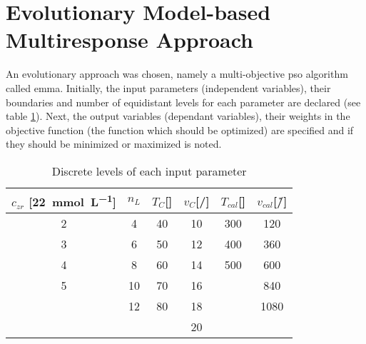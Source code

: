 \section{Evolutionary Model-based Multiresponse Approach}
\label{sec:ss}
An evolutionary approach was chosen, namely a multi-objective 
\gls{pso} algorithm called \gls{emma}\cite{villanova2010function,Kennedy1995,Breiman1997,Carta2011}.
%
%
Initially, the input parameters (independent variables), their boundaries and number of equidistant levels for each parameter are declared (see table \ref{tab:input}).
Next, the output variables (dependant variables), their weights in the objective function (the function which should be optimized) are specified and if they should be minimized or maximized is noted.
%
\begin{table}[htb]
	\centering
	\begin{tabular}{cc cc cc}
		\hline\hline
        $c_{zr}$ [\SI{22}{\milli\mol\per\liter}]	&$n_L$	&$T_{C}$[\oc{}]	&$v_{C}$[\mm{}/\s{}]	&$T_{cal}$[\oc{}]	&$v_{cal}$[\oc{}/\h{}]	\\
		\hline
		2				&4		&40					&10				&300				&120	\\
		3				&6		&50					&12				&400				&360	\\
		4				&8		&60					&14				&500				&600	\\
		5				&10		&70					&16				&					&840	\\
						&12		&80					&18				&					&1080	\\
						&		&					&20				&					&		\\
		\hline\hline
	\end{tabular}
	\caption{Discrete levels of each input parameter }
	\label{tab:input}
\end{table}

